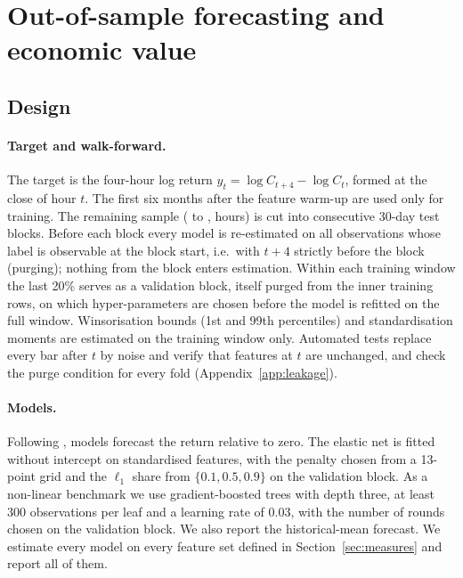\section{Out-of-sample forecasting and economic value}\label{sec:forecast}

\subsection{Design}

\paragraph{Target and walk-forward.} The target is the four-hour log return
$y_{t}=\log C_{t+4}-\log C_t$, formed at the close of hour $t$. The first six months after the
feature warm-up are used only for training. The remaining sample (\BTCoosStart{} to \BTCoosEnd,
\BTCnOOS{} hours) is cut into \BTCnFoldsWF{} consecutive 30-day test blocks. Before each block every
model is re-estimated on all observations whose label is observable at the block start, i.e.\ with
$t+4$ strictly before the block (purging); nothing from the block enters estimation. Within each
training window the last 20\% serves as a validation block, itself purged from the inner training
rows, on which hyper-parameters are chosen before the model is refitted on the full window.
Winsorisation bounds (1st and 99th percentiles) and standardisation moments are estimated on the
training window only. Automated tests replace every bar after $t$ by noise and verify that features
at $t$ are unchanged, and check the purge condition for every fold (Appendix~\ref{app:leakage}).

\paragraph{Models.} Following \citet{gu2020}, models forecast the return relative to zero. The
elastic net is fitted without intercept on standardised features, with the penalty chosen from a
13-point grid and the $\ell_1$ share from $\{0.1,0.5,0.9\}$ on the validation block. As a non-linear
benchmark we use gradient-boosted trees with depth three, at least 300 observations per leaf and a
learning rate of 0.03, with the number of rounds chosen on the validation block. We also report the
historical-mean forecast. We estimate every model on every feature set defined in
Section~\ref{sec:measures} and report all of them.

